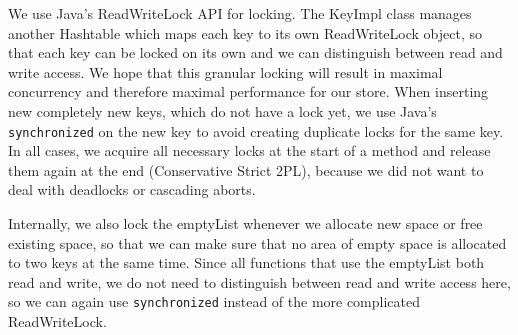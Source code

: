 \documentclass[12pt,a4paper]{article}
\begin{document}
We use Java's ReadWriteLock API for locking. The KeyImpl class manages another Hashtable which maps each key to its own ReadWriteLock object, so that each key can be locked on its own and we can distinguish between read and write access. We hope that this granular locking will result in maximal concurrency and therefore maximal performance for our store. When inserting new completely new keys, which do not have a lock yet, we use Java's \texttt{synchronized} on the new key to avoid creating duplicate locks for the same key. In all cases, we acquire all necessary locks at the start of a method and release them again at the end (Conservative Strict 2PL), because we did not want to deal with deadlocks or cascading aborts. 

Internally, we also lock the emptyList whenever we allocate new space or free existing space, so that we can make sure that no area of empty space is allocated to two keys at the same time. Since all functions that use the emptyList both read and write, we do not need to distinguish between read and write access here, so we can again use \texttt{synchronized} instead of the more complicated ReadWriteLock.
\end{document}
